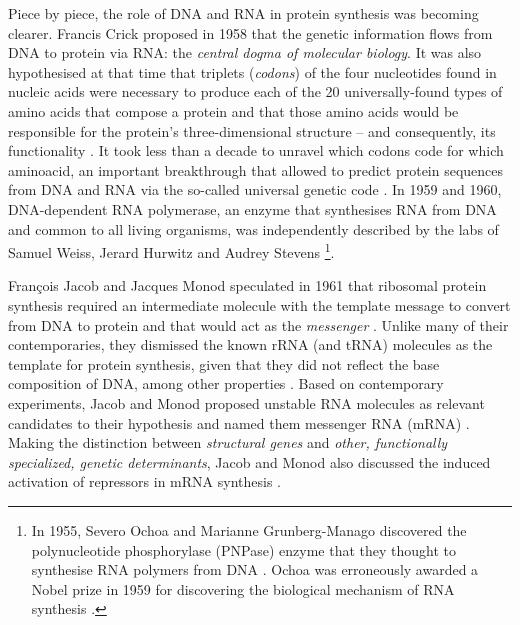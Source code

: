 Piece by piece, the role of DNA and RNA in protein synthesis was becoming clearer. Francis Crick proposed in 1958 that the genetic information flows from DNA to protein via RNA: the \emph{central dogma of molecular biology}\cite{crick:1958ws,crick:1970aa}. It was also hypothesised at that time that triplets (\emph{codons}) of the four nucleotides found in nucleic acids were necessary to produce each of the 20 universally-found types of amino acids that compose a protein \cite{crick:1958ws,crick:1961ui} and that those amino acids would be responsible for the protein's three-dimensional structure -- and consequently, its functionality \cite{crick:1958ws}. It took less than a decade to unravel which codons code for which aminoacid, an important breakthrough that allowed to predict protein sequences from DNA and RNA via the so-called universal genetic code \cite{khorana:1966vr,crick:1968wg}. %
In 1959 and 1960, DNA-dependent RNA polymerase, an enzyme that synthesises RNA from DNA and common to all living organisms, was independently described by the labs of Samuel Weiss, Jerard Hurwitz and Audrey Stevens \cite{hurwitz:1960uf,weiss:1959vp,stevens:1960ue} \footnote{In 1955, Severo Ochoa and Marianne Grunberg-Manago discovered the polynucleotide phosphorylase (PNPase) enzyme that they thought to synthesise RNA polymers from DNA \cite{grunberg-manago:1956wb}. Ochoa was erroneously awarded a Nobel prize in 1959 for discovering the biological mechanism of RNA synthesis \cite{}.}.


François Jacob and Jacques Monod speculated in 1961 that ribosomal protein synthesis required an intermediate molecule with the template message to convert from DNA to protein and that would act as the \emph{messenger} \cite{jacob:1961uh,brenner:1961ve}. Unlike many of their contemporaries, they dismissed the known rRNA (and tRNA) molecules as the template for protein synthesis, given that they did not reflect the base composition of DNA, among other properties \cite{jacob:1961uh}. Based on contemporary experiments, Jacob and Monod proposed unstable RNA molecules as relevant candidates to their hypothesis and named them messenger RNA (mRNA) \cite{jacob:1961uh,brenner:1961ve}. Making the distinction between \emph{structural genes} and \emph{other, functionally specialized, genetic determinants}, Jacob and Monod also discussed the induced activation of repressors in mRNA synthesis \cite{jacob:1961uh}.


